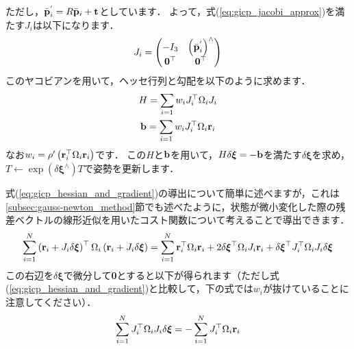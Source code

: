 %
ただし，$\bar{ {\bf p} }_{i}^{'} = R \bar{ {\bf p} }_{i} + {\bf t}$としています．
よって，式(\ref{eq:gicp_jacobi_approx})を満たす$J_{i}$は以下になります．
%
\begin{align}
  J_{i} = \left( \begin{matrix}
            -I_{3}         & \left( \bar{ {\bf p} }_{i}^{'} \right)^{\wedge} \\
            {\bf 0}^{\top} & {\bf 0}^{\top}
          \end{matrix} \right)
  \label{eq:gicp_jacobian}
\end{align}
%
このヤコビアンを用いて，ヘッセ行列と勾配を以下のように求めます．
%
\begin{align}
  \begin{gathered}
    H = \sum_{i=1} w_{i} J_{i}^{\top} \Omega_{i} J_{i} \\
    {\bf b} = \sum_{i=1} w_{i} J_{i}^{\top} \Omega_{i} {\bf r}_{i} \\
  \end{gathered}
  \label{eq:gicp_hessian_and_gradient}
\end{align}
%
なお$w_{i} = \rho^{\prime} \left( {\bf r}_{i}^{\top} \Omega_{i} {\bf r}_{i} \right)$です．
この$H$と${\bf b}$を用いて，$H \delta \boldsymbol \xi = -{\bf b}$を満たす$\delta \boldsymbol \xi$を求め，$T \leftarrow \exp \left( \delta \boldsymbol \xi^{\wedge} \right) T$で姿勢を更新します．

式(\ref{eq:gicp_hessian_and_gradient})の導出について簡単に述べますが，これは\ref{subsec:gauss-newton_method}節でも述べたように，状態が微小変化した際の残差ベクトルの線形近似を用いたコスト関数について考えることで導出できます．
%
\begin{align}
  \sum_{i=1}^{N} \left( {\bf r}_{i} + J_{i} \delta \boldsymbol \xi \right)^{\top} \Omega_{i} \left( {\bf r}_{i} + J_{i} \delta \boldsymbol \xi \right)
  =
  \sum_{i=1}^{N} {\bf r}_{i}^{\top} \Omega_{i} {\bf r}_{i} + 2 \delta \boldsymbol \xi^{\top} \Omega_{i} J_{i} {\bf r}_{i} + \delta \boldsymbol \xi^{\top} J_{i}^{\top} \Omega_{i} J_{i} \delta \boldsymbol \xi
\end{align}
%
この右辺を$\delta \boldsymbol \xi$で微分して{\bf 0}とすると以下が得られます（ただし式(\ref{eq:gicp_hessian_and_gradient})と比較して，下の式では$w_{i}$が抜けていることに注意してください）．
%
\begin{align}
  \sum_{i=1}^{N} J_{i}^{\top} \Omega_{i} J_{i} \delta \boldsymbol \xi = -\sum_{i=1}^{N}  J_{i}^{\top} \Omega_{i} {\bf r}_{i}
\end{align}
%



